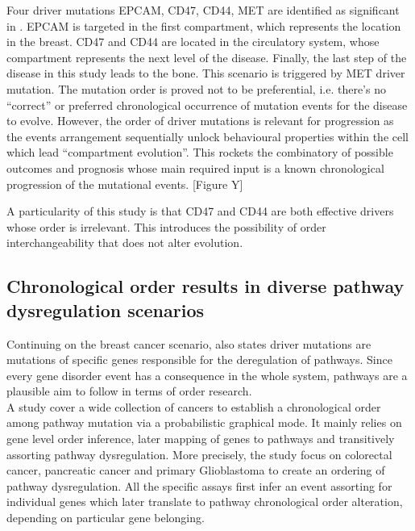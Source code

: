 Four driver mutations {EPCAM, CD47, CD44, MET} are identified as significant in \cite{Ascolani2019ModelingMatter}. EPCAM is targeted in the first compartment, which represents the location in the breast. CD47 and CD44 are located in the circulatory system, whose compartment represents the next level of the disease. Finally, the last step of the disease in this study leads to the bone. This scenario is triggered by MET driver mutation. The mutation order is proved not to be preferential, i.e. there’s no “correct” or preferred chronological occurrence of mutation events for the disease to evolve. However, the order of driver mutations is relevant for progression as the events arrangement sequentially unlock behavioural properties within the cell which lead “compartment evolution”. This rockets the combinatory of possible outcomes and prognosis whose main required input is a known chronological progression of the mutational events. [Figure Y]

A particularity of this study is that CD47 and CD44 are both effective drivers whose order is irrelevant. This introduces the possibility of order interchangeability that does not alter evolution.
\\
\subsection{Chronological order results in diverse pathway dysregulation scenarios}
Continuing on the breast cancer scenario, \cite{Ascolani2019ModelingMatter} also states driver mutations are mutations of specific genes responsible for the deregulation of pathways. Since every gene disorder event has a consequence in the whole system, pathways are a plausible aim to follow in terms of order research.
\\

A study \cite{Gerstung2011TheTumorigenesis} cover a wide collection of cancers to establish a chronological order among pathway mutation via a probabilistic graphical mode. It mainly relies on gene level order inference, later mapping of genes to pathways and transitively assorting pathway dysregulation. More precisely, the study focus on colorectal cancer, pancreatic cancer and primary Glioblastoma to create an ordering of pathway dysregulation. All the specific assays first infer an event assorting for individual genes which later translate to pathway chronological order alteration, depending on particular gene belonging.\\

